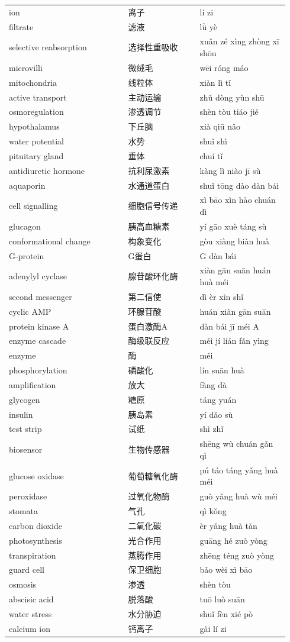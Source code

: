 \documentclass[11pt]{article}
\begin{document}
\begin{longtable}{@{}p{0.40\linewidth}p{0.24\linewidth}p{0.30\linewidth}@{}}
ion & 离子 & lí zi \\
filtrate & 滤液 & lǜ yè \\
selective reabsorption & 选择性重吸收 & xuǎn zé xìng zhòng xī shōu \\
microvilli & 微绒毛 & wēi róng máo \\
mitochondria & 线粒体 & xiàn lì tǐ \\
active transport & 主动运输 & zhǔ dòng yùn shū \\
osmoregulation & 渗透调节 & shèn tòu tiáo jié \\
hypothalamus & 下丘脑 & xià qiū nǎo \\
water potential & 水势 & shuǐ shì \\
pituitary gland & 垂体 & chuí tǐ \\
antidiuretic hormone & 抗利尿激素 & kàng lì niào jī sù \\
aquaporin & 水通道蛋白 & shuǐ tōng dào dàn bái \\
cell signalling & 细胞信号传递 & xì bāo xìn hào chuán dì \\
glucagon & 胰高血糖素 & yí gāo xuè táng sù \\
conformational change & 构象变化 & gòu xiàng biàn huà \\
G-protein & G蛋白 & G dàn bái \\
adenylyl cyclase & 腺苷酸环化酶 & xiàn gān suān huán huà méi \\
second messenger & 第二信使 & dì èr xìn shǐ \\
cyclic AMP & 环腺苷酸 & huán xiàn gān suān \\
protein kinase A & 蛋白激酶A & dàn bái jī méi A \\
enzyme cascade & 酶级联反应 & méi jí lián fǎn yìng \\
enzyme & 酶 & méi \\
phosphorylation & 磷酸化 & lín suān huà \\
amplification & 放大 & fàng dà \\
glycogen & 糖原 & táng yuán \\
insulin & 胰岛素 & yí dǎo sù \\
test strip & 试纸 & shì zhǐ \\
biosensor & 生物传感器 & shēng wù chuán gǎn qì \\
glucose oxidase & 葡萄糖氧化酶 & pú táo táng yǎng huà méi \\
peroxidase & 过氧化物酶 & guò yǎng huà wù méi \\
stomata & 气孔 & qì kǒng \\
carbon dioxide & 二氧化碳 & èr yǎng huà tàn \\
photosynthesis & 光合作用 & guāng hé zuò yòng \\
transpiration & 蒸腾作用 & zhēng téng zuò yòng \\
guard cell & 保卫细胞 & bǎo wèi xì bāo \\
osmosis & 渗透 & shèn tòu \\
abscisic acid & 脱落酸 & tuō luò suān \\
water stress & 水分胁迫 & shuǐ fèn xié pò \\
calcium ion & 钙离子 & gài lí zi \\
\end{longtable}
\end{document}
